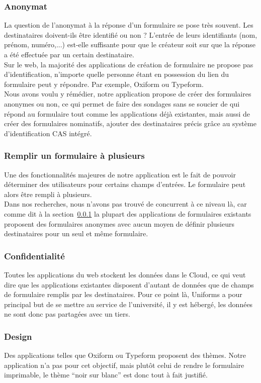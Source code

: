 \documentclass{sigplanconf}
\begin{document}
\subsubsection{Anonymat}\label{sec:anonymat}
La question de l’anonymat à la réponse d’un formulaire se pose très souvent. Les destinataires doivent-ils être identifié ou non ? L’entrée de leurs identifiants (nom, prénom, numéro,...) est-elle suffisante pour que le créateur soit sur que la réponse a été effectuée par un certain destinataire.\\
Sur le web, la majorité des applications de création de formulaire ne propose pas d’identification, n’importe quelle personne étant en possession du lien du formulaire peut y répondre. Par exemple, Oxiform ou Typeform. \\
Nous avons voulu y rémédier, notre application propose de créer des formulaires anonymes ou non, ce qui permet de faire des sondages sans se soucier de qui répond au formulaire tout comme les applications déjà existantes, mais aussi de créer des formulaires nominatifs, ajouter des destinataires précis grâce au système d’identification CAS intégré.
\subsubsection{Remplir un formulaire à plusieurs}
Une des fonctionnalités majeures de notre application est le fait de pouvoir déterminer des utilisateurs pour certains champs d'entrées. Le formulaire peut alors être rempli à plusieurs.\\
Dans nos recherches, nous n'avons pas trouvé de concurrent à ce niveau là, car comme dit à la section~\ref{sec:anonymat} la plupart des applications de formulaires existants proposent des formulaires anonymes avec aucun moyen de définir plusieurs destinataires pour un seul et même formulaire.
\subsubsection{Confidentialité}
Toutes les applications du web stockent les données dans le Cloud, ce qui veut dire que les applications existantes disposent d’autant de données que de champs de formulaire remplis par les destinataires. Pour ce point là, Uniforms a pour principal but de se mettre au service de l’université, il y est hébergé, les données ne sont donc pas partagées avec un tiers.
\subsubsection{Design}
Des applications telles que Oxiform ou Typeform proposent des thèmes. Notre application n’a pas pour cet objectif, mais plutôt celui de rendre le formulaire imprimable, le thème “noir sur blanc” est donc tout à fait justifié.
\end{document}
